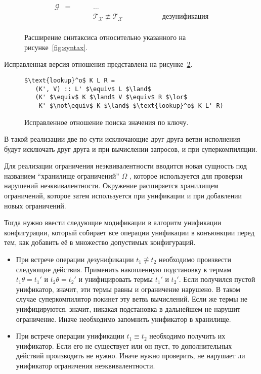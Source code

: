 \begin{figure}[h!]
\centering
\[\begin{array}{ccll}
\mathcal{G}   & = & \hspace{1cm} \dots & \\
              &   & \hspace{1cm} \mathcal{T_X}\not\equiv\mathcal{T_X} \hspace{2cm} &\mbox{дезунификация} \\
\end{array}\]
\caption{Расширение синтаксиса \ukanren относительно указанного на рисунке~\ref{fig:syntax}.}
\label{fig:syntaxExt}
\end{figure}

Исправленная версия отношения  представлена на рисунке~\ref{fig:lookupExt}.

\begin{figure}[h!]
\begin{lstlisting}
$\text{lookup}^o$ K L R =
   (K', V) :: L' $\equiv$ L $\land$
   (K' $\equiv$ K $\land$ V $\equiv$ R $\lor$
    K' $\not\equiv$ K $\land$ $\text{lookup}^o$ K L' R)
\end{lstlisting}
\caption{Исправленное отношение поиска значения по ключу.}
\label{fig:lookupExt}
\end{figure}

В такой реализации две по сути исключающие друг друга ветви исполнения будут исключать друг друга
и при вычислении запросов, и при суперкомпиляции.

Для реализации ограничения неэквивалентности вводится новая сущность под названием
``хранилище ограничений'' $\Omega$ , которое используется для проверки
нарушений неэквивалентности. Окружение расширяется хранилищем ограничений, которое затем используется
при унификации и при добавлении новых ограничений.

Тогда нужно ввести следующие модификации в алгоритм унификации конфигурации, который собирает все
операции унификации в конъюнкции перед тем, как добавить её в множество допустимых конфигураций.
\begin{itemize}
\item При встрече операции дезунификации $t_1 \not\equiv t_2$ необходимо произвести следующие действия.
      Применить накопленную подстановку к термам $t_1 \theta = t_1'$ и $t_2 \theta = t_2'$ и 
      унифицировать термы $t_1'$ и $t_2'$. Если получился пустой унификатор, значит, эти термы
      равны и ограничение нарушено. В таком случае суперкомпилятор покинет эту
      ветвь вычислений. Если же термы не унифицируются, значит, никакая подстановка
      в дальнейшем не нарушит ограничение. Иначе необходимо запомнить унификатор в хранилище.
\item При встрече операции унификации $t_1 \equiv t_2$ необходимо получить их унификатор.
      Если его не существует или он пуст, то дополнительных действий производить не нужно.
	  Иначе нужно проверить, не нарушает ли унификатор ограничения неэквивалентности.
\end{itemize}

